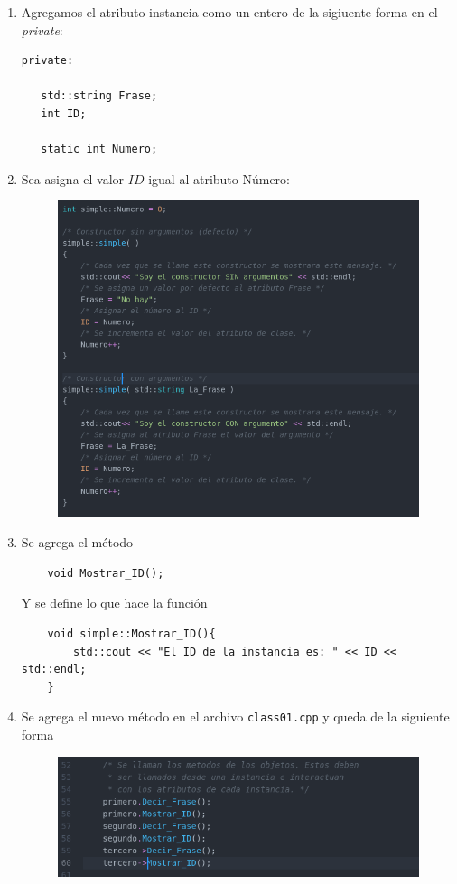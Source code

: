 \vspace{0.5cm}

\begin{enumerate}[1)]
	\item Agregamos el atributo instancia como un entero de la sigiuente forma en el \textit{private}:
		\begin{lstlisting}
private:

   std::string Frase;
   int ID;

   static int Numero;
		\end{lstlisting}
	\item Sea asigna el valor $ID$ igual al atributo Número:
		\begin{figure}[H]
			\centering
			\includegraphics[scale=0.5]{./img/id_numero.png}
		\end{figure}
	\item Se agrega el método
		\begin{lstlisting}
	void Mostrar_ID();
		\end{lstlisting}
		Y se define lo que hace la función
		\begin{lstlisting}
	void simple::Mostrar_ID(){
    	std::cout << "El ID de la instancia es: " << ID << std::endl;
	}
		\end{lstlisting}
	\item Se agrega el nuevo método en el archivo \texttt{class01.cpp} y queda de la siguiente forma
		\begin{figure}[H]
			\centering
			\includegraphics[scale=0.5]{./img/class01.png}

\end{figure}
\end{enumerate}
